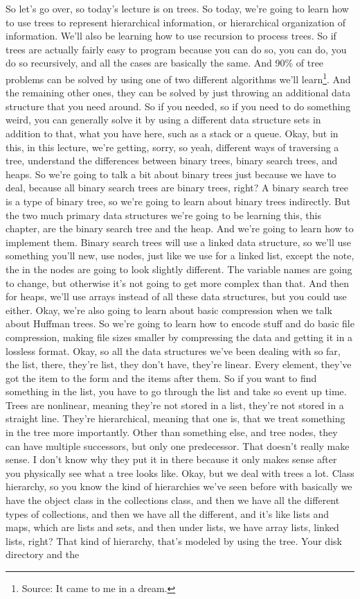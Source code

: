 So let's go over, so today's lecture is on trees. So today, we're going to learn how to use trees to represent hierarchical information, or hierarchical organization of information. We'll also be learning how to use recursion to process trees. So if trees are actually fairly easy to program because you can do so, you can do, you do so recursively, and all the cases are basically the same. And 90\% of tree problems can be solved by using one of two different algorithms we'll learn\footnote{Source:  It came to me in a dream.}. And the remaining other ones, they can be solved by just throwing an additional data structure that you need around. So if you needed, so if you need to do something weird, you can generally solve it by using a different data structure sets in addition to that, what you have here, such as a stack or a queue. Okay, but in this, in this lecture, we're getting, sorry, so yeah, different ways of traversing a tree, understand the differences between binary trees, binary search trees, and heaps. So we're going to talk a bit about binary trees just because we have to deal, because all binary search trees are binary trees, right? A binary search tree is a type of binary tree, so we're going to learn about binary trees indirectly. But the two much primary data structures we're going to be learning this, this chapter, are the binary search tree and the heap. And we're going to learn how to implement them. Binary search trees will use a linked data structure, so we'll use something you'll new, use nodes, just like we use for a linked list, except the note, the in the nodes are going to look slightly different. The variable names are going to change, but otherwise it's not going to get more complex than that. And then for heaps, we'll use arrays instead of all these data structures, but you could use either. Okay, we're also going to learn about basic compression when we talk about Huffman trees. So we're going to learn how to encode stuff and do basic file compression, making file sizes smaller by compressing the data and getting it in a lossless format. Okay, so all the data structures we've been dealing with so far, the list, there, they're list, they don't have, they're linear. Every element, they've got the item to the form and the items after them. So if you want to find something in the list, you have to go through the list and take so event up time. Trees are nonlinear, meaning they're not stored in a list, they're not stored in a straight line. They're hierarchical, meaning that one is, that we treat something in the tree more importantly. Other than something else, and tree nodes, they can have multiple successors, but only one predecessor. That doesn't really make sense. I don't know why they put it in there because it only makes sense after you physically see what a tree looks like. Okay, but we deal with trees a lot. Class hierarchy, so you know the kind of hierarchies we've seen before with basically we have the object class in the collections class, and then we have all the different types of collections, and then we have all the different, and it's like lists and maps, which are lists and sets, and then under lists, we have array lists, linked lists, right? That kind of hierarchy, that's modeled by using the tree. Your disk directory and the 